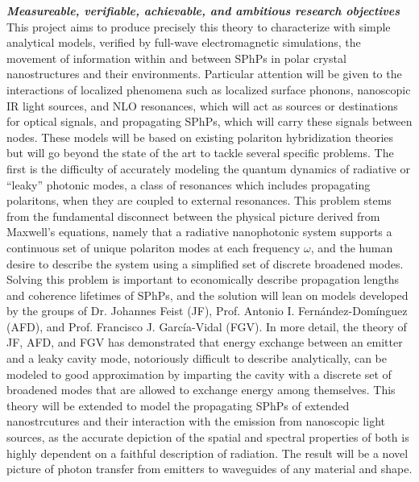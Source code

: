 \documentclass[11pt,a4paper]{article}
\begin{document}




\textbf{\textit{Measureable, verifiable, achievable, and ambitious research objectives}} This project aims to produce precisely this theory to characterize with simple analytical models, verified by full-wave electromagnetic simulations, the movement of information within and between SPhPs in polar crystal nanostructures and their environments. Particular attention will be given to the interactions of localized phenomena such as localized surface phonons, nanoscopic IR light sources, and NLO resonances, which will act as sources or destinations for optical signals, and propagating SPhPs, which will carry these signals between nodes. These models will be based on existing polariton hybridization theories but will go beyond the state of the art to tackle several specific problems. The first is the difficulty of accurately modeling the quantum dynamics of radiative or ``leaky'' photonic modes, a class of resonances which includes propagating polaritons, when they are coupled to external resonances. This problem stems from the fundamental disconnect between the physical picture derived from Maxwell's equations, namely that a radiative nanophotonic system supports a continuous set of unique polariton modes at each frequency $\omega$, and the human desire to describe the system using a simplified set of discrete broadened modes. Solving this problem is important to economically describe propagation lengths and coherence lifetimes of SPhPs, and the solution will lean on models developed by the groups of Dr. Johannes Feist (JF), Prof. Antonio I. Fern\'{a}ndez-Dom\'{i}nguez (AFD), and Prof. Francisco J. Garc\'{i}a-Vidal (FGV). In more detail, the theory of JF, AFD, and FGV has demonstrated that energy exchange between an emitter and a leaky cavity mode, notoriously difficult to describe analytically, can be modeled to good approximation by imparting the cavity with a discrete set of broadened modes that are allowed to exchange energy among themselves.\supercite{medina_few-mode_2021} This theory will be extended to model the propagating SPhPs of extended nanostrcutures and their interaction with the emission from nanoscopic light sources, as the accurate depiction of the spatial and spectral properties of both is highly dependent on a faithful description of radiation. The result will be a novel picture of photon transfer from emitters to waveguides of any material and shape.
\end{document}
